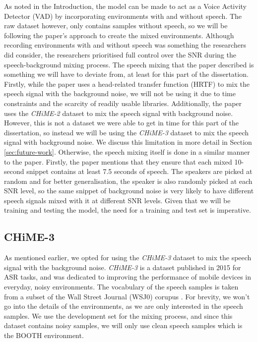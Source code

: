 \documentclass[logo,bsc,singlespacing,parskip,online]{infthesis}
\newcommand{\chime}[1]{\textit{CHiME-#1}\xspace}
\begin{document}
As noted in the Introduction, the model can be made to act as a Voice Activity Detector (VAD) by incorporating environments with and without speech.
The raw dataset however, only contains samples without speech, so we will be following the paper's approach to create the mixed environments.
Although recording environments with and without speech was something the researchers did consider, the researchers prioritised full control over the SNR during the speech-background mixing process.
The speech mixing that the paper described is something we 
will have to deviate from, at least for this part of the dissertation.
Firstly, while the paper uses a head-related transfer function (HRTF) to mix the speech signal with the background noise,
we will not be using it due to time constraints and the scarcity of readily usable libraries.
Additionally, the paper uses the \chime{2} dataset \citep{vincent_second_2013} to mix the speech signal with background noise.
However, this is not a dataset we were able to get in time for this part 
of the dissertation, so instead we will be using the \chime{3} dataset \citep{barker_third_2015} to mix the speech signal with background noise.
We discuss this limitation in more detail in Section \ref{sec:future-work}.
Otherwise, the speech mixing itself is done in a similar manner to the paper.
Firstly, the paper mentions that they ensure that each mixed 10-second snippet contains at least 7.5 seconds of speech.
The speakers are picked at random and for better generalisation, the speaker is also randomly 
picked at each SNR level, so the same snippet of background noise is very likely 
to have different speech signals mixed with it at different SNR levels.
Given that we will be training and testing the model, the need for a training and test set is imperative. 

\subsection{CHiME-3}
 As mentioned earlier, we opted for using the \chime{3} dataset to mix the speech signal with the background noise. 
\chime{3} is a dataset published in 2015 for ASR tasks, and was dedicated to improving the performance of mobile devices 
in everyday, noisy environments. The vocabulary of the speech samples is taken from a subset of the Wall Street Journal (WSJ0) corupus \cite{wsj0}.
For brevity, we won't go into the details of the environments, as we 
are only interested in the speech samples. 
We use the development set for the mixing process,
and since this dataset contains noisy samples, we will only use clean speech samples 
which is the BOOTH environment.
\end{document}
